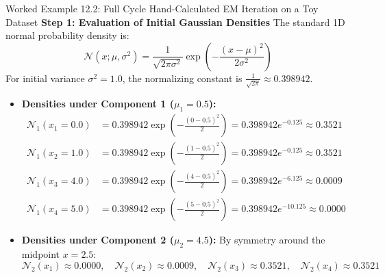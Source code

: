 \begin{examplebox}[breakable]{Worked Example 12.2: Full Cycle Hand-Calculated EM Iteration on a Toy Dataset}
\textbf{Step 1: Evaluation of Initial Gaussian Densities}
The standard 1D normal probability density is:
\begin{equation}
\mathcal{N}(x; \mu, \sigma^2) = \frac{1}{\sqrt{2\pi \sigma^2}} \exp\left( -\frac{(x - \mu)^2}{2\sigma^2} \right)
\end{equation}
For initial variance $\sigma^2 = 1.0$, the normalizing constant is $\frac{1}{\sqrt{2\pi}} \approx 0.398942$.
\begin{itemize}
    \item \textbf{Densities under Component 1 ($\mu_1 = 0.5$):}
    \begin{align}
    \mathcal{N}_1(x_1 = 0.0) &= 0.398942 \exp\left(-\frac{(0 - 0.5)^2}{2}\right) = 0.398942 e^{-0.125} \approx \mathbf{0.3521} \\
    \mathcal{N}_1(x_2 = 1.0) &= 0.398942 \exp\left(-\frac{(1 - 0.5)^2}{2}\right) = 0.398942 e^{-0.125} \approx \mathbf{0.3521} \\
    \mathcal{N}_1(x_3 = 4.0) &= 0.398942 \exp\left(-\frac{(4 - 0.5)^2}{2}\right) = 0.398942 e^{-6.125} \approx \mathbf{0.0009} \\
    \mathcal{N}_1(x_4 = 5.0) &= 0.398942 \exp\left(-\frac{(5 - 0.5)^2}{2}\right) = 0.398942 e^{-10.125} \approx \mathbf{0.0000}
    \end{align}
    \item \textbf{Densities under Component 2 ($\mu_2 = 4.5$):}
    By symmetry around the midpoint $x = 2.5$:
    \begin{equation}
    \mathcal{N}_2(x_1) \approx \mathbf{0.0000}, \quad \mathcal{N}_2(x_2) \approx \mathbf{0.0009}, \quad \mathcal{N}_2(x_3) \approx \mathbf{0.3521}, \quad \mathcal{N}_2(x_4) \approx \mathbf{0.3521}
    \end{equation}
\end{itemize}


\end{examplebox}
